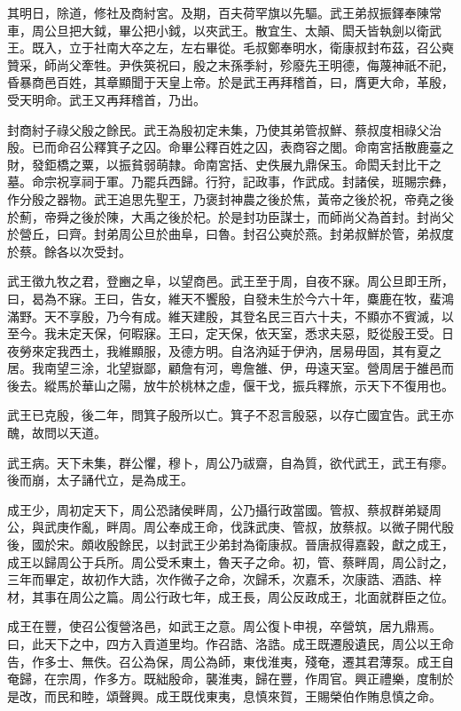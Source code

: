 其明日，除道，修社及商紂宮。及期，百夫荷罕旗以先驅。武王弟叔振鐸奉陳常車，周公旦把大鉞，畢公把小鉞，以夾武王。散宜生、太顛、閎夭皆執劍以衛武王。既入，立于社南大卒之左，左右畢從。毛叔鄭奉明水，衛康叔封布茲，召公奭贊采，師尚父牽牲。尹佚筴祝曰，殷之末孫季紂，殄廢先王明德，侮蔑神祇不祀，昏暴商邑百姓，其章顯聞于天皇上帝。於是武王再拜稽首，曰，膺更大命，革殷，受天明命。武王又再拜稽首，乃出。

封商紂子祿父殷之餘民。武王為殷初定未集，乃使其弟管叔鮮、蔡叔度相祿父治殷。已而命召公釋箕子之囚。命畢公釋百姓之囚，表商容之閭。命南宮括散鹿臺之財，發鉅橋之粟，以振貧弱萌隸。命南宮括、史佚展九鼎保玉。命閎夭封比干之墓。命宗祝享祠于軍。乃罷兵西歸。行狩，記政事，作武成。封諸侯，班賜宗彝，作分殷之器物。武王追思先聖王，乃褒封神農之後於焦，黃帝之後於祝，帝堯之後於薊，帝舜之後於陳，大禹之後於杞。於是封功臣謀士，而師尚父為首封。封尚父於營丘，曰齊。封弟周公旦於曲阜，曰魯。封召公奭於燕。封弟叔鮮於管，弟叔度於蔡。餘各以次受封。

武王徵九牧之君，登豳之阜，以望商邑。武王至于周，自夜不寐。周公旦即王所，曰，曷為不寐。王曰，告女，維天不饗殷，自發未生於今六十年，麋鹿在牧，蜚鴻滿野。天不享殷，乃今有成。維天建殷，其登名民三百六十夫，不顯亦不賓滅，以至今。我未定天保，何暇寐。王曰，定天保，依天室，悉求夫惡，貶從殷王受。日夜勞來定我西土，我維顯服，及德方明。自洛汭延于伊汭，居易毋固，其有夏之居。我南望三涂，北望嶽鄙，顧詹有河，粵詹雒、伊，毋遠天室。營周居于雒邑而後去。縱馬於華山之陽，放牛於桃林之虛，偃干戈，振兵釋旅，示天下不復用也。

武王已克殷，後二年，問箕子殷所以亡。箕子不忍言殷惡，以存亡國宜告。武王亦醜，故問以天道。

武王病。天下未集，群公懼，穆卜，周公乃祓齋，自為質，欲代武王，武王有瘳。後而崩，太子誦代立，是為成王。

成王少，周初定天下，周公恐諸侯畔周，公乃攝行政當國。管叔、蔡叔群弟疑周公，與武庚作亂，畔周。周公奉成王命，伐誅武庚、管叔，放蔡叔。以微子開代殷後，國於宋。頗收殷餘民，以封武王少弟封為衛康叔。晉唐叔得嘉穀，獻之成王，成王以歸周公于兵所。周公受禾東土，魯天子之命。初，管、蔡畔周，周公討之，三年而畢定，故初作大誥，次作微子之命，次歸禾，次嘉禾，次康誥、酒誥、梓材，其事在周公之篇。周公行政七年，成王長，周公反政成王，北面就群臣之位。

成王在豐，使召公復營洛邑，如武王之意。周公復卜申視，卒營筑，居九鼎焉。曰，此天下之中，四方入貢道里均。作召誥、洛誥。成王既遷殷遺民，周公以王命告，作多士、無佚。召公為保，周公為師，東伐淮夷，殘奄，遷其君薄泵。成王自奄歸，在宗周，作多方。既絀殷命，襲淮夷，歸在豐，作周官。興正禮樂，度制於是改，而民和睦，頌聲興。成王既伐東夷，息慎來賀，王賜榮伯作賄息慎之命。

